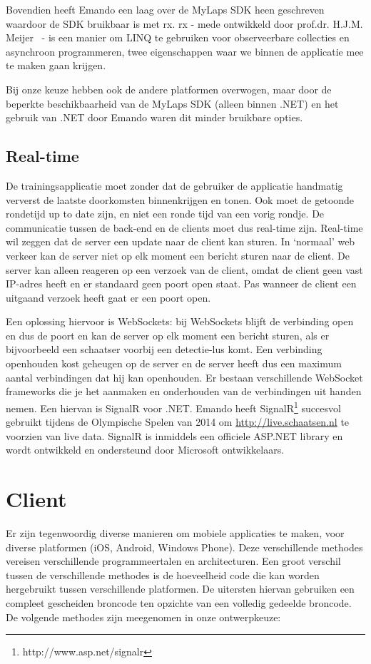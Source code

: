 Bovendien heeft Emando een laag over de MyLaps SDK heen geschreven waardoor de SDK bruikbaar is met \acf{rx}. \ac{rx} - mede ontwikkeld door prof.dr. H.J.M. Meijer~\cite{meijer2011world} - is een manier om LINQ te gebruiken voor observeerbare collecties en asynchroon programmeren, twee eigenschappen waar we binnen de applicatie mee te maken gaan krijgen.

Bij onze keuze hebben ook de andere platformen overwogen, maar door de beperkte beschikbaarheid van de MyLaps SDK (alleen binnen .NET) en het gebruik van .NET door Emando waren dit minder bruikbare opties.

\subsection{Real-time}\label{sec:orientatie-real-time}
De trainingsapplicatie moet zonder dat de gebruiker de applicatie handmatig ververst de laatste doorkomsten binnenkrijgen en tonen. Ook moet de getoonde rondetijd up to date zijn, en niet een ronde tijd van een vorig rondje. De communicatie tussen de back-end en de clients moet dus real-time zijn. Real-time wil zeggen dat de server een update naar de client kan sturen. In `normaal' web verkeer kan de server niet op elk moment een bericht sturen naar de client. De server kan alleen reageren op een verzoek van de client, omdat de client geen vast IP-adres heeft en er standaard geen poort open staat. Pas wanneer de client een uitgaand verzoek heeft gaat er een poort open.

Een oplossing hiervoor is WebSockets: bij WebSockets blijft de verbinding open en dus de poort en kan de server op elk moment een bericht sturen, als er bijvoorbeeld een schaatser voorbij een detectie-lus komt. Een verbinding openhouden kost geheugen op de server en de server heeft dus een maximum aantal verbindingen dat hij kan openhouden. Er bestaan verschillende WebSocket frameworks die je het aanmaken en onderhouden van de verbindingen uit handen nemen. Een hiervan is SignalR voor .NET. Emando heeft SignalR\footnote{http://www.asp.net/signalr} succesvol gebruikt tijdens de Olympische Spelen van 2014 om \url{http://live.schaatsen.nl} te voorzien van live data. SignalR is inmiddels een officiele ASP.NET library en wordt ontwikkeld en ondersteund door Microsoft ontwikkelaars.

\section{Client}
Er zijn tegenwoordig diverse manieren om mobiele applicaties te maken, voor diverse platformen (iOS, Android, Windows Phone). Deze verschillende methodes vereisen verschillende programmeertalen en architecturen. Een groot verschil tussen de verschillende methodes is de hoeveelheid code die kan worden hergebruikt tussen verschillende platformen. De uitersten hiervan gebruiken een compleet gescheiden broncode ten opzichte van een volledig gedeelde broncode. De volgende methodes zijn meegenomen in onze ontwerpkeuze:

